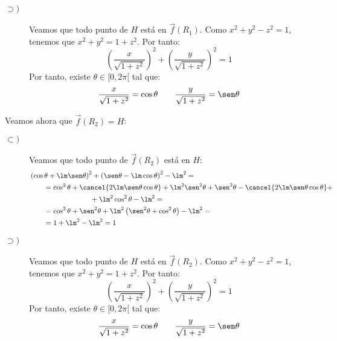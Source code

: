 \begin{ejercicio}
\begin{enumerate}
\begin{description}
            \item[$\supset)$] Veamos que todo punto de $H$ está en $\vec{f}(R_1)$.
            Como $x^2+y^2-z^2=1$, tenemos que $x^2+y^2=1+z^2$. Por tanto:
            \begin{equation*}
                \left(\frac{x}{\sqrt{1+z^2}}\right)^2 + \left(\frac{y}{\sqrt{1+z^2}}\right)^2 = 1
            \end{equation*}
            Por tanto, existe $\theta\in [0,2\pi[$ tal que:
            \begin{equation*}
                \frac{x}{\sqrt{1+z^2}} = \cos\theta \qquad \frac{y}{\sqrt{1+z^2}} = \sen\theta
            \end{equation*}

        \end{description}

        Veamos ahora que $\vec{f}(R_2)=H$:
        \begin{description}
            \item[$\subset)$] Veamos que todo punto de $\vec{f}(R_2)$ está en $H$:
            \begin{align*}
                &\left(\cos\theta + \lm \sen\theta\right)^2 + \left(\sen\theta - \lm \cos\theta\right)^2 - \lm^2
                =\\&\qquad = \cos^2\theta + \cancel{2\lm\sen\theta\cos\theta} + \lm^2\sen^2\theta + \sen^2\theta - \cancel{2\lm\sen\theta\cos\theta} +\\&\hspace{3cm}+ \lm^2\cos^2\theta - \lm^2
                =\\&\qquad = \cos^2\theta + \sen^2\theta +\lm^2\left(\sen^2\theta + \cos^2\theta\right) - \lm^2
                =\\&\qquad = 1 + \lm^2 - \lm^2 = 1
            \end{align*}

            \item[$\supset)$] Veamos que todo punto de $H$ está en $\vec{f}(R_2)$.
            Como $x^2+y^2-z^2=1$, tenemos que $x^2+y^2=1+z^2$. Por tanto:
            \begin{equation*}
                \left(\frac{x}{\sqrt{1+z^2}}\right)^2 + \left(\frac{y}{\sqrt{1+z^2}}\right)^2 = 1
            \end{equation*}
            Por tanto, existe $\theta\in [0,2\pi[$ tal que:
            \begin{equation*}
                \frac{x}{\sqrt{1+z^2}} = \cos\theta \qquad \frac{y}{\sqrt{1+z^2}} = \sen\theta
            \end{equation*}
        \end{description}
            


\end{enumerate}
\end{ejercicio}
